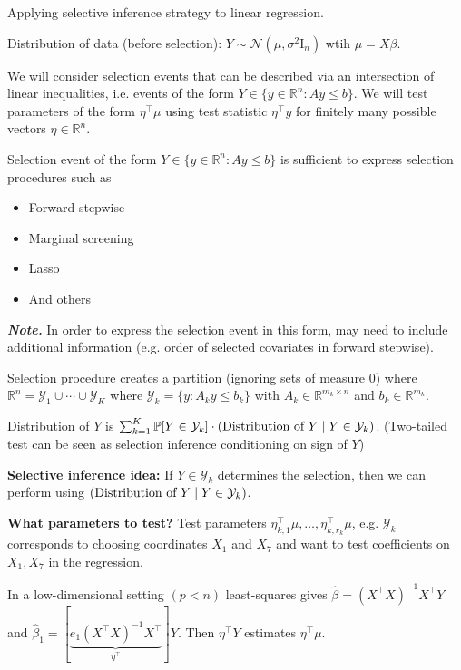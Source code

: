 \begin{example}
    Applying selective inference strategy to linear regression.

    Distribution of data (before selection): $Y\sim\mathcal{N}(\mu,\sigma^2\text{I}_{n})$ wtih $\mu=X\beta$.

    We will consider selection events that can be described via an intersection of linear inequalities, i.e. events of the form $Y\in \{y\in\mathbb{R}^n\colon Ay\leq b\}$. We will test parameters of the form $\eta^\top \mu$ using test statistic $\eta^\top y$ for finitely many possible vectors $\eta \in \mathbb{R}^n$.

    Selection event of the form $Y\in \{y\in\mathbb{R}^n\colon Ay\leq b\}$ is sufficient to express selection procedures such as 
    \begin{itemize}
        \item Forward stepwise
        \item Marginal screening
        \item Lasso
        \item And others
    \end{itemize}
    \emph{\textbf{Note.}} In order to express the selection event in this form, may need to include additional information (e.g. order of selected covariates in forward stepwise).

    Selection procedure creates a partition (ignoring sets of measure 0) where $\mathbb{R}^n = \mathcal{Y}_1\cup \cdots \cup \mathcal{Y}_K$ where $\mathcal{Y}_k = \{y \colon A_ky\leq b_k\}$ with $A_k\in\mathbb{R}^{m_k\times n}$ and $b_k \in \mathbb{R}^{m_k}$.

    Distribution of $Y$ is $\sum_{k=1}^K\mathbb{P}[Y\in\mathcal{Y}_k] \cdot (\textup{Distribution of }Y\mid Y\in\mathcal{Y}_k)$. (Two-tailed test can be seen as selection inference conditioning on sign of $Y$)

    \textbf{Selective inference idea:} If $Y\in \mathcal{Y}_k$ determines the selection, then we can perform using $(\textup{Distribution of }Y\mid Y\in\mathcal{Y}_k)$.

    \textbf{What parameters to test?} Test parameters $\eta_{k,1}^\top\mu, \dots, \eta_{k,r_k}^\top\mu$, e.g. $\mathcal{Y}_k$ corresponds to choosing coordinates $X_1$ and $X_7$ and want to test coefficients on $X_1,X_7$ in the regression.

    In a low-dimensional setting $(p<n)$ least-squares gives $\hat{\beta} = (X^\top X)^{-1}X^\top Y$ and $\hat{\beta}_1 = [\underbrace{e_1 (X^\top X)^{-1}X^\top}_{\eta^\top}]Y$. Then $\eta^\top Y$ estimates $\eta^\top \mu$.


\end{example}
